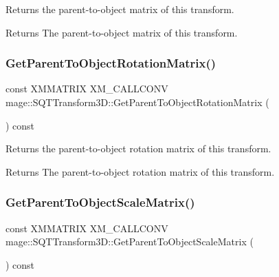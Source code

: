 Returns the parent-\/to-\/object matrix of this transform.

\begin{DoxyReturn}{Returns}
The parent-\/to-\/object matrix of this transform. 
\end{DoxyReturn}
\mbox{\label{classmage_1_1_s_q_t_transform3_d_a1cafde2eb0c314245d9be42703adda45}} 
\subsubsection{\texorpdfstring{Get\+Parent\+To\+Object\+Rotation\+Matrix()}{GetParentToObjectRotationMatrix()}}
{\footnotesize\ttfamily const X\+M\+M\+A\+T\+R\+IX X\+M\+\_\+\+C\+A\+L\+L\+C\+O\+NV mage\+::\+S\+Q\+T\+Transform3\+D\+::\+Get\+Parent\+To\+Object\+Rotation\+Matrix (\begin{DoxyParamCaption}{ }\end{DoxyParamCaption}) const\hspace{0.3cm}{\ttfamily [noexcept]}}

Returns the parent-\/to-\/object rotation matrix of this transform.

\begin{DoxyReturn}{Returns}
The parent-\/to-\/object rotation matrix of this transform. 
\end{DoxyReturn}
\mbox{\label{classmage_1_1_s_q_t_transform3_d_ad0da8593cfc43f42f9369d1f5c99cf5e}} 
\subsubsection{\texorpdfstring{Get\+Parent\+To\+Object\+Scale\+Matrix()}{GetParentToObjectScaleMatrix()}}
{\footnotesize\ttfamily const X\+M\+M\+A\+T\+R\+IX X\+M\+\_\+\+C\+A\+L\+L\+C\+O\+NV mage\+::\+S\+Q\+T\+Transform3\+D\+::\+Get\+Parent\+To\+Object\+Scale\+Matrix (\begin{DoxyParamCaption}{ }\end{DoxyParamCaption}) const\hspace{0.3cm}{\ttfamily [noexcept]}}

